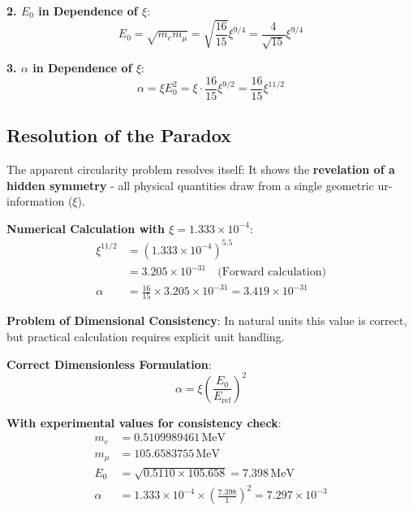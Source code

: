\documentclass[12pt,a4paper]{article}
\newcommand{\xipar}{\xi}
\newcommand{\alphagem}{\alpha}
\newcommand{\Ezero}{E_0}
\begin{document}
	\textbf{2. $\Ezero$ in Dependence of $\xipar$}:
	\begin{equation}
		\Ezero = \sqrt{m_e m_\mu} = \sqrt{\frac{16}{15}} \xipar^{9/4} = \frac{4}{\sqrt{15}} \xipar^{9/4}
	\end{equation}
	
	\textbf{3. $\alphagem$ in Dependence of $\xipar$}:
	\begin{equation}
		\alphagem = \xipar \Ezero^2 = \xipar \cdot \frac{16}{15} \xipar^{9/2} = \frac{16}{15} \xipar^{11/2}
	\end{equation}
	
	\subsection{Resolution of the Paradox}
	
	The apparent circularity problem resolves itself: It shows the \textbf{revelation of a hidden symmetry} - all physical quantities draw from a single geometric ur-information ($\xipar$).
	
	\textbf{Numerical Calculation with $\xipar = 1{.}333 \times 10^{-4}$}:
	\begin{align}
		\xipar^{11/2} &= (1{.}333 \times 10^{-4})^{5{.}5} \\
		&= 3{.}205 \times 10^{-31} \quad \text{(Forward calculation)} \\
		\alphagem &= \frac{16}{15} \times 3{.}205 \times 10^{-31} = 3{.}419 \times 10^{-31}
	\end{align}
	
	\textbf{Problem of Dimensional Consistency}: In natural units this value is correct, but practical calculation requires explicit unit handling.
	
	\textbf{Correct Dimensionless Formulation}:
	\begin{equation}
		\alphagem = \xipar \left(\frac{\Ezero}{E_{\text{ref}}}\right)^2
	\end{equation}
	
	\textbf{With experimental values for consistency check}:
	\begin{align}
		m_e &= 0{.}5109989461\,\text{MeV} \\
		m_\mu &= 105{.}6583755\,\text{MeV} \\
		\Ezero &= \sqrt{0{.}5110 \times 105{.}658} = 7{.}398\,\text{MeV} \\
		\alphagem &= 1{.}333 \times 10^{-4} \times \left(\frac{7{.}398}{1}\right)^2 = 7{.}297 \times 10^{-3}
	\end{align}
	
\end{document}
